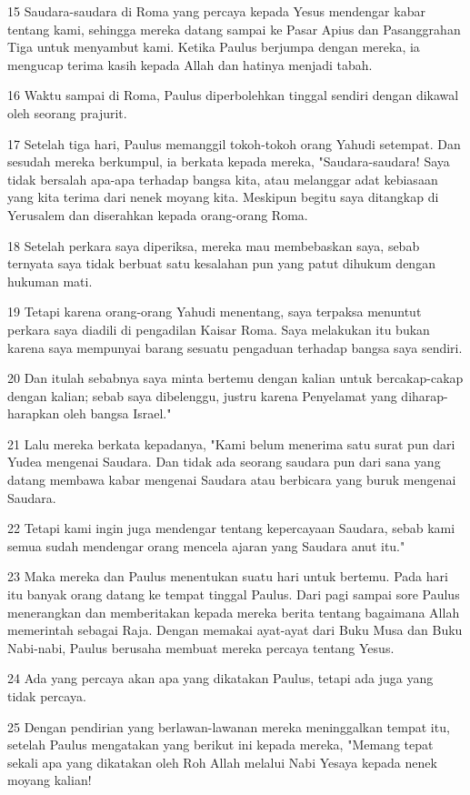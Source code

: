 \par 15 Saudara-saudara di Roma yang percaya kepada Yesus mendengar kabar tentang kami, sehingga mereka datang sampai ke Pasar Apius dan Pasanggrahan Tiga untuk menyambut kami. Ketika Paulus berjumpa dengan mereka, ia mengucap terima kasih kepada Allah dan hatinya menjadi tabah.
\par 16 Waktu sampai di Roma, Paulus diperbolehkan tinggal sendiri dengan dikawal oleh seorang prajurit.
\par 17 Setelah tiga hari, Paulus memanggil tokoh-tokoh orang Yahudi setempat. Dan sesudah mereka berkumpul, ia berkata kepada mereka, "Saudara-saudara! Saya tidak bersalah apa-apa terhadap bangsa kita, atau melanggar adat kebiasaan yang kita terima dari nenek moyang kita. Meskipun begitu saya ditangkap di Yerusalem dan diserahkan kepada orang-orang Roma.
\par 18 Setelah perkara saya diperiksa, mereka mau membebaskan saya, sebab ternyata saya tidak berbuat satu kesalahan pun yang patut dihukum dengan hukuman mati.
\par 19 Tetapi karena orang-orang Yahudi menentang, saya terpaksa menuntut perkara saya diadili di pengadilan Kaisar Roma. Saya melakukan itu bukan karena saya mempunyai barang sesuatu pengaduan terhadap bangsa saya sendiri.
\par 20 Dan itulah sebabnya saya minta bertemu dengan kalian untuk bercakap-cakap dengan kalian; sebab saya dibelenggu, justru karena Penyelamat yang diharap-harapkan oleh bangsa Israel."
\par 21 Lalu mereka berkata kepadanya, "Kami belum menerima satu surat pun dari Yudea mengenai Saudara. Dan tidak ada seorang saudara pun dari sana yang datang membawa kabar mengenai Saudara atau berbicara yang buruk mengenai Saudara.
\par 22 Tetapi kami ingin juga mendengar tentang kepercayaan Saudara, sebab kami semua sudah mendengar orang mencela ajaran yang Saudara anut itu."
\par 23 Maka mereka dan Paulus menentukan suatu hari untuk bertemu. Pada hari itu banyak orang datang ke tempat tinggal Paulus. Dari pagi sampai sore Paulus menerangkan dan memberitakan kepada mereka berita tentang bagaimana Allah memerintah sebagai Raja. Dengan memakai ayat-ayat dari Buku Musa dan Buku Nabi-nabi, Paulus berusaha membuat mereka percaya tentang Yesus.
\par 24 Ada yang percaya akan apa yang dikatakan Paulus, tetapi ada juga yang tidak percaya.
\par 25 Dengan pendirian yang berlawan-lawanan mereka meninggalkan tempat itu, setelah Paulus mengatakan yang berikut ini kepada mereka, "Memang tepat sekali apa yang dikatakan oleh Roh Allah melalui Nabi Yesaya kepada nenek moyang kalian!
